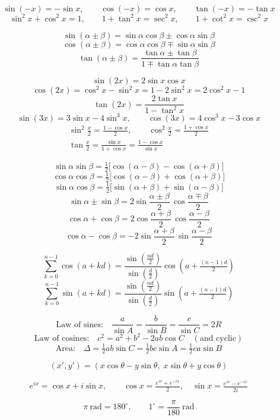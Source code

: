 
\begin{flushright}
\small
\setlength{\abovedisplayskip}{6pt}
\setlength{\belowdisplayskip}{6pt}

$$ \sin(-x)=-\sin x,\qquad \cos(-x)=\cos x,\qquad \tan(-x)=-\tan x $$
$$ \sin^2 x+\cos^2 x=1,\qquad 1+\tan^2 x=\sec^2 x,\qquad 1+\cot^2 x=\csc^2 x $$

$$ \sin(\alpha\pm\beta)=\sin\alpha\cos\beta\pm\cos\alpha\sin\beta $$
$$ \cos(\alpha\pm\beta)=\cos\alpha\cos\beta\mp\sin\alpha\sin\beta $$
$$ \tan(\alpha\pm\beta)=\frac{\tan\alpha\pm\tan\beta}{1\mp\tan\alpha\tan\beta} $$

$$ \sin(2x)=2\sin x\cos x $$
$$ \cos(2x)=\cos^2 x-\sin^2 x=1-2\sin^2 x=2\cos^2 x-1 $$
$$ \tan(2x)=\frac{2\tan x}{1-\tan^2 x} $$
$$ \sin(3x)=3\sin x-4\sin^3 x,\qquad \cos(3x)=4\cos^3 x-3\cos x $$
\begin{gather*}
\sin^2\!\frac{x}{2}=\frac{1-\cos x}{2},\qquad
\cos^2\!\frac{x}{2}=\frac{1+\cos x}{2}\\
\tan\!\frac{x}{2}=\frac{\sin x}{1+\cos x}=\frac{1-\cos x}{\sin x}
\end{gather*}

$$ \sin\alpha\sin\beta=\tfrac12\big[\cos(\alpha-\beta)-\cos(\alpha+\beta)\big] $$
$$ \cos\alpha\cos\beta=\tfrac12\big[\cos(\alpha-\beta)+\cos(\alpha+\beta)\big] $$
$$ \sin\alpha\cos\beta=\tfrac12\big[\sin(\alpha+\beta)+\sin(\alpha-\beta)\big] $$
$$ \sin\alpha\pm\sin\beta=2\sin\!\frac{\alpha\pm\beta}{2}\,\cos\!\frac{\alpha\mp\beta}{2} $$
$$ \cos\alpha+\cos\beta=2\cos\!\frac{\alpha+\beta}{2}\,\cos\!\frac{\alpha-\beta}{2} $$
$$ \cos\alpha-\cos\beta=-2\sin\!\frac{\alpha+\beta}{2}\,\sin\!\frac{\alpha-\beta}{2} $$

$$ \sum_{k=0}^{n-1}\cos(a+kd)=\frac{\sin(\tfrac{nd}{2})}{\sin(\tfrac{d}{2})}
   \cos\!\left(a+\tfrac{(n-1)d}{2}\right) $$
$$ \sum_{k=0}^{n-1}\sin(a+kd)=\frac{\sin(\tfrac{nd}{2})}{\sin(\tfrac{d}{2})}
   \sin\!\left(a+\tfrac{(n-1)d}{2}\right) $$

$$ \text{Law of sines:}\quad \frac{a}{\sin A}=\frac{b}{\sin B}=\frac{c}{\sin C}=2R $$
$$ \text{Law of cosines:}\quad c^2=a^2+b^2-2ab\cos C \quad (\text{and cyclic}) $$
$$ \text{Area:}\quad \Delta=\tfrac12 ab\sin C=\tfrac12 bc\sin A=\tfrac12 ca\sin B $$

$$ (x',y')=(x\cos\theta-y\sin\theta,\; x\sin\theta+y\cos\theta) $$

$$ e^{ix}=\cos x+i\sin x,\qquad
   \cos x=\tfrac{e^{ix}+e^{-ix}}{2},\quad
   \sin x=\tfrac{e^{ix}-e^{-ix}}{2i} $$

$$ \pi\ \text{rad}=180^{\circ},\qquad 1^{\circ}=\frac{\pi}{180}\ \text{rad} $$

\end{flushright}

